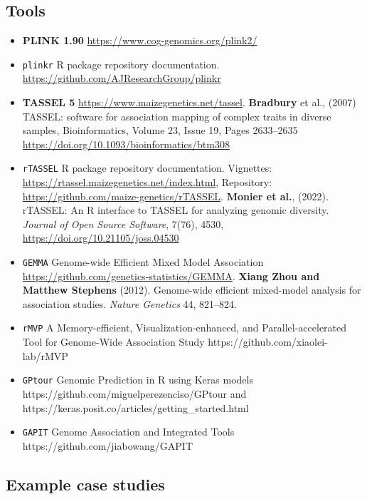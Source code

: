 \documentclass[a4paper,10pt]{article}
\begin{document}
\hypertarget{tools}{%
  \subsection{Tools}\label{tools}}

\begin{itemize}
  \item
        \textbf{PLINK 1.90} \url{https://www.cog-genomics.org/plink2/}
  \item
        \texttt{plinkr} R package repository documentation.
        \url{https://github.com/AJResearchGroup/plinkr}
  \item
        \textbf{TASSEL 5} \url{https://www.maizegenetics.net/tassel}.
        \textbf{Bradbury} et al., (2007) TASSEL: software for association
        mapping of complex traits in diverse samples, Bioinformatics, Volume
        23, Issue 19, Pages 2633--2635
        \url{https://doi.org/10.1093/bioinformatics/btm308}
  \item
        \texttt{rTASSEL} R package repository documentation. Vignettes:
        \url{https://rtassel.maizegenetics.net/index.html}, Repository:
        \url{https://github.com/maize-genetics/rTASSEL}. \textbf{Monier et
          al.}, (2022). rTASSEL: An R interface to TASSEL for analyzing genomic
        diversity. \emph{Journal of Open Source Software}, 7(76), 4530,
        \url{https://doi.org/10.21105/joss.04530}
  \item
        \texttt{GEMMA} Genome-wide Efficient Mixed Model Association
        \url{https://github.com/genetics-statistics/GEMMA}. \textbf{Xiang Zhou
          and Matthew Stephens} (2012). Genome-wide efficient mixed-model
        analysis for association studies. \emph{Nature Genetics} 44, 821--824.
  \item
        \texttt{rMVP} A Memory-efficient, Visualization-enhanced, and
        Parallel-accelerated Tool for Genome-Wide Association Study
        https://github.com/xiaolei-lab/rMVP
  \item
        \texttt{GPtour} Genomic Prediction in R using Keras models
        https://github.com/miguelperezenciso/GPtour and
        https://keras.posit.co/articles/getting\_started.html
  \item
        \texttt{GAPIT} Genome Association and Integrated Tools
        https://github.com/jiabowang/GAPIT
\end{itemize}

\hypertarget{example-case-studies}{%
  \subsection{Example case studies}\label{example-case-studies}}
\end{document}
